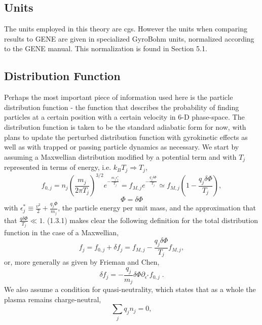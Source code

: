 \documentclass[12pt]{article}
\numberwithin{equation}{subsection}
\begin{document}
\subsection{Units}
   \quad The units employed in this theory are cgs. However the units when comparing results to GENE are given in specialized GyroBohm units,
normalized according to the GENE manual. This normalization is found in Section 5.1.

\subsection{Distribution Function}
   \quad Perhaps the most important piece of information used here is the particle distribution function - the function that describes the
probability of finding particles at a certain position with a certain velocity in 6-D phase-space. The distribution function is taken to be
the standard adiabatic form for now, with plans to update the perturbed distribution function with gyrokinetic effects as well as with trapped
or passing particle dynamics as necessary. We start by assuming a Maxwellian distribution modified by a potential term and with $T_j$ represented
in terms of energy, i.e. $k_B T_j \Rightarrow T_j$,
   \begin{equation}
      f_{0,j} = n_j\left(\frac{m_j}{2\pi T_j}\right)^{3/2}e^{-\frac{m_j \epsilon^*_j}{T_j}}
              = f_{M,j}e^{-\frac{q_j\delta\Phi}{T_j}} \simeq f_{M,j}(1-\frac{q_j\delta\Phi}{T_j}),
   \end{equation}
   \begin{equation}
      \Phi = \delta\Phi
   \end{equation}
with $\epsilon^*_j \equiv \frac{v^2}{2} + \frac{q_j\Phi}{m_j}$, the particle energy per unit mass, and the approximation that
that $\frac{q\delta\Phi}{T_j} \ll 1$. (1.3.1) makes clear the following definition for the total distribution function in the
case of a Maxwellian,
   \begin{equation}
      f_j = f_{0,j} + \delta f_j = f_{M,j} - \frac{q_j\delta\Phi}{T_j}f_{M,j},
   \end{equation}
or, more generally as given by Frieman and Chen\cite{FriemanChen},
   \begin{equation}
      \delta f_j = -\frac{q_j}{m_j}\delta\Phi\partial_{\epsilon^*}f_{0,j}\;.
   \end{equation}
We also assume a condition for quasi-neutrality, which states that as a whole the plasma remains charge-neutral,
   \begin{equation}
      \sum\limits_{j}q_j n_j = 0,
   \end{equation}
\end{document}
